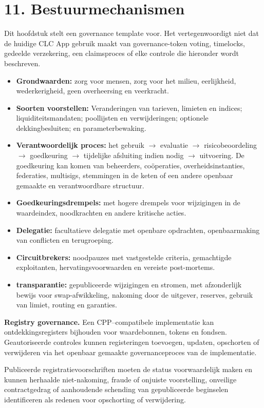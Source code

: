 \documentclass[11pt]{article}
\begin{document}
\section*{11. Bestuurmechanismen}

Dit hoofdstuk stelt een governance template voor. Het vertegenwoordigt niet dat de huidige CLC App gebruik maakt van governance-token voting, timelocks, gedeelde verzekering, een claimsproces of elke controle die hieronder wordt beschreven.

\begin{itemize}[leftmargin=*]
\item \textbf{Grondwaarden:} zorg voor mensen, zorg voor het milieu, eerlijkheid, wederkerigheid, geen overheersing en veerkracht.
\item \textbf{Soorten voorstellen:} Veranderingen van tarieven, limieten en indices; liquiditeitsmandaten; poollijsten en verwijderingen; optionele dekkingbesluiten; en parameterbewaking.
\item \textbf{Verantwoordelijk proces:} het gebruik $\to$ evaluatie $\to$ risicobeoordeling $\to$ goedkeuring $\to$ tijdelijke afsluiting indien nodig $\to$ uitvoering. De goedkeuring kan komen van beheerders, coöperaties, overheidsinstanties, federaties, multisigs, stemmingen in de keten of een andere openbaar gemaakte en verantwoordbare structuur.
\item \textbf{Goedkeuringsdrempels:} met hogere drempels voor wijzigingen in de waardeindex, noodkrachten en andere kritische acties.
\item \textbf{Delegatie:} facultatieve delegatie met openbare opdrachten, openbaarmaking van conflicten en terugroeping.
\item \textbf{Circuitbrekers:} noodpauzes met vastgestelde criteria, gemachtigde exploitanten, hervatingsvoorwaarden en vereiste post-mortems.
\item \textbf{transparantie:} gepubliceerde wijzigingen en stromen, met afzonderlijk bewijs voor swap-afwikkeling, nakoming door de uitgever, reserves, gebruik van limiet, routing en garanties.
\end{itemize}
\textbf{Registry governance.} Een CPP--compatibele implementatie kan ontdekkingsregisters bijhouden voor waardebonnen, tokens en fondsen. Geautoriseerde controles kunnen registeringen toevoegen, updaten, opschorten of verwijderen via het openbaar gemaakte governanceproces van de implementatie.

Publiceerde registratievoorschriften moeten de status voorwaardelijk maken en kunnen herhaalde niet-nakoming, fraude of onjuiste voorstelling, onveilige contractgedrag of aanhoudende schending van gepubliceerde beginselen identificeren als redenen voor opschorting of verwijdering.
\end{document}
